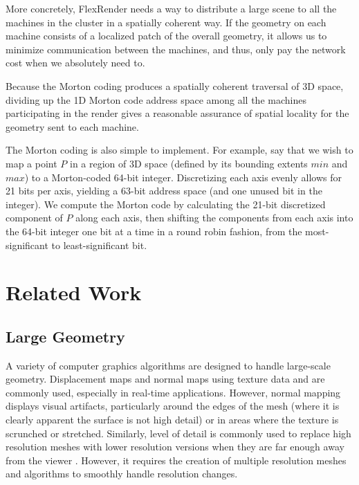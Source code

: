 \documentclass[a4paper,twoside]{article}
\begin{document}
More concretely, FlexRender needs a way to distribute a large scene to all the
machines in the cluster in a spatially coherent way. If the geometry on each
machine consists of a localized patch of the overall geometry, it allows us to
minimize communication between the machines, and thus, only pay the network cost
when we absolutely need to.

Because the Morton coding produces a spatially coherent traversal of 3D space,
dividing up the 1D Morton code address space among all the machines participating
in the render gives a reasonable assurance of spatial locality for the geometry
sent to each machine.

The Morton coding is also simple to implement. For example, say that we wish to
map a point $P$ in a region of 3D space (defined by its bounding extents
$min$ and $max$) to a Morton-coded 64-bit integer. Discretizing each axis evenly
allows for 21 bits per axis, yielding a 63-bit address space (and one unused bit
in the integer). We compute the Morton code by calculating the 21-bit
discretized component of $P$ along each axis, then shifting the components from
each axis into the 64-bit integer one bit at a time in a round robin fashion, from the
most-significant to least-significant bit.

\section{Related Work}
\label{relatedwork}

\subsection{Large Geometry}
\label{largegeometry}

A variety of computer graphics algorithms are designed to handle large-scale
geometry. Displacement maps \cite{krishnamurthy:1996} and normal maps using
texture data \cite{cohen:1998} and \cite{cignoni:1998} are commonly used,
especially in real-time applications. However, normal mapping displays visual
artifacts, particularly around the edges of the mesh (where it is clearly
apparent the surface is not high detail) or in areas where the texture is
scrunched or stretched. Similarly, level of detail is commonly used to replace
high resolution meshes with lower resolution versions when they are far enough
away from the viewer \cite{clark:1976}. However, it requires the creation of
multiple resolution meshes and algorithms to smoothly handle resolution changes.
\end{document}
